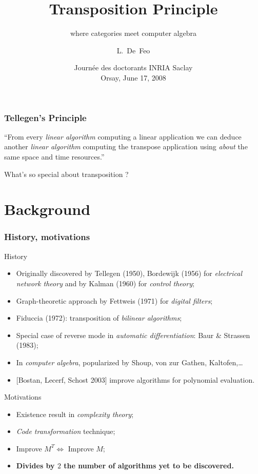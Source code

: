 \documentclass[10pt,handout]{beamer}
\title{Transposition Principle}
\subtitle{where categories meet computer algebra}
\author{L.~De~Feo}
\institute[TANC]{Projet TANC, LIX, École Polytechnique}
\date[INRIA Saclay, Juin 17, 2008]{Journée des doctorants INRIA Saclay\\Orsay, June 17, 2008}
\begin{document}
\begin{frame}
  \titlepage
\end{frame}


\begin{frame}
  \frametitle{Tellegen's Principle}

  \Large
  \begin{center}
    ``From every \emph{linear algorithm} computing a
    linear application we can deduce another \emph{linear algorithm}
    computing the transpose application using \emph{about} the same
    space and time resources.''
  \end{center}

  \vfill

  \begin{center}
    What's so special about transposition ?
  \end{center}
\end{frame}

\section{Background}

\begin{frame}
  \frametitle{History, motivations}
  
  \begin{block}{History}
    \begin{itemize}
    \item Originally discovered by \alert{Tellegen (1950)},
      \alert{Bordewijk (1956)} for \emph{electrical network theory}
      and by \alert{Kalman (1960)} for \emph{control theory};
    \item Graph-theoretic approach by \alert{Fettweis (1971)} for
      \emph{digital filters};
    \item \alert{Fiduccia (1972)}: transposition of \emph{bilinear
      algorithms};
    \item Special case of reverse mode in \emph{automatic differentiation}:
      \alert{Baur \& Strassen (1983)};
    \item In \emph{computer algebra}, popularized by \alert{Shoup},
      \alert{von zur Gathen}, \alert{Kaltofen},\dots
    \item \alert{[Bostan, Lecerf, Schost 2003]} improve algorithms for
      polynomial evaluation.
    \end{itemize}
  \end{block}
  
  \begin{block}{Motivations}
    \begin{itemize}
    \item Existence result in \emph{complexity theory};
    \item \emph{Code transformation} technique;
    \item Improve $M^T \Leftrightarrow$ Improve $M$;
    \item {\bf Divides by $2$ the number of algorithms yet to be discovered.}
    \end{itemize}
  \end{block}
\end{frame}
\end{document}
